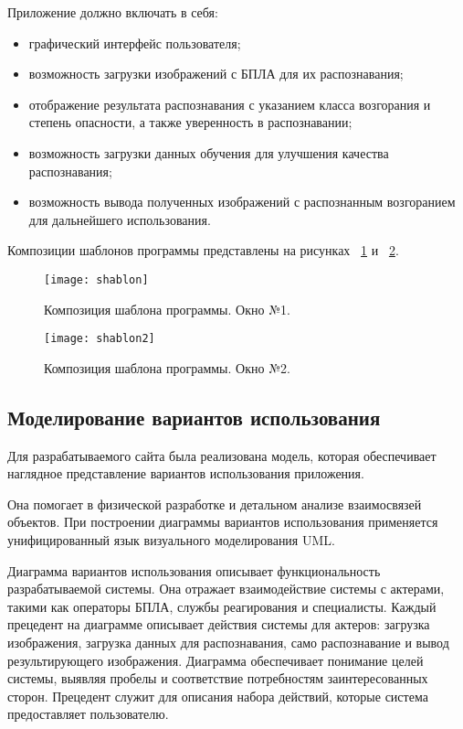 Приложение должно включать в себя:
\begin{itemize}
    \item графический интерфейс пользователя;
    \item возможность загрузки изображений с БПЛА для их распознавания;
    \item отображение результата распознавания с указанием класса возгорания и степень опасности, а также уверенность в распознавании;
    \item возможность загрузки данных обучения для улучшения качества распознавания;
    \item возможность вывода полученных изображений с распознанным возгоранием для дальнейшего использования.
\end{itemize}

Композиции шаблонов программы представлены на рисунках ~\ref{shablon:image} и ~\ref{shablon2:image}.

\begin{figure}[ht]
\texttt{[image: shablon]}
\caption{Композиция шаблона программы. Окно №1.}
\label{shablon:image}
\end{figure}

\begin{figure}[H]
\texttt{[image: shablon2]}
\caption{Композиция шаблона программы. Окно №2.}
\label{shablon2:image}
\end{figure}

\subsection{Моделирование вариантов использования}

Для разрабатываемого сайта была реализована модель, которая обеспечивает наглядное представление вариантов использования приложения.

Она помогает в физической разработке и детальном анализе взаимосвязей объектов. При построении диаграммы вариантов использования применяется унифицированный язык визуального моделирования UML.

Диаграмма вариантов использования описывает функциональность разрабатываемой системы. Она отражает взаимодействие системы с актерами, такими как операторы БПЛА, службы реагирования и специалисты. Каждый прецедент на диаграмме описывает действия системы для актеров: загрузка изображения, загрузка данных для распознавания, само распознавание и вывод результирующего изображения. Диаграмма обеспечивает понимание целей системы, выявляя пробелы и соответствие потребностям заинтересованных сторон. Прецедент служит для описания набора действий, которые система предоставляет пользователю.

